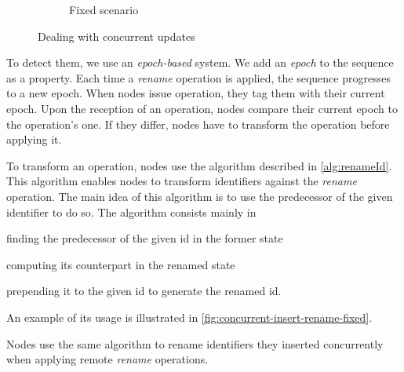 \documentclass[sigplan,10pt]{acmart}
\newcommand{\trm}[1]{\mathit{#1}}
\newcommand{\id}[3]{$\trm{#1}^{\trm{#2}}_{\trm{#3}}$}
\newcommand{\widthletter}{7mm}
\begin{document}
\begin{figure}[ht!]
\begin{subfigure}{\columnwidth}
        \caption{Fixed scenario}
        \label{fig:concurrent-insert-rename-fixed}
    \end{subfigure}
    \caption{Dealing with concurrent updates}
    \label{fig:concurrent-insert-rename}
\end{figure}

To detect them, we use an \emph{epoch-based} system.
We add an \emph{epoch} to the sequence as a property.
Each time a \emph{rename} operation is applied, the sequence progresses to a new epoch.
When nodes issue operation, they tag them with their current epoch.
Upon the reception of an operation, nodes compare their current epoch to the operation's one.
If they differ, nodes have to transform the operation before applying it.

To transform an operation, nodes use the algorithm described in \autoref{alg:renameId}.
This algorithm enables nodes to transform identifiers against the \emph{rename} operation.
The main idea of this algorithm is to use the predecessor of the given identifier to do so.
The algorithm consists mainly in
\begin{enumerate*}
    \item finding the predecessor of the given id in the former state
    \item computing its counterpart in the renamed state
    \item prepending it to the given id to generate the renamed id.
\end{enumerate*}
An example of its usage is illustrated in \autoref{fig:concurrent-insert-rename-fixed}.

Nodes use the same algorithm to rename identifiers they inserted concurrently when applying remote \emph{rename} operations.
\end{document}
